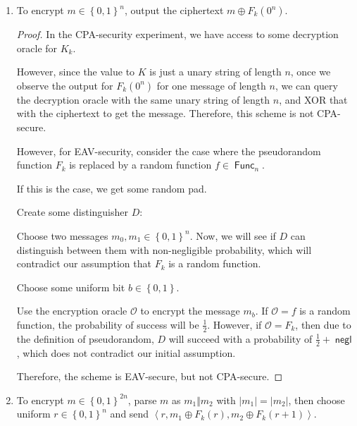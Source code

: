 \documentclass{article}
\DeclareMathOperator{\Func}{\textsf{Func}}
\DeclareMathOperator{\negl}{\textsf{negl}}
\begin{document}
\begin{enumerate}
\begin{enumerate}
\begin{proof}
            Therefore, it is neither EAV-secure, nor CPA-secure.
          \end{proof}

        \item To encrypt $m \in \left\{0, 1\right\}^n$, output the ciphertext $m
          \oplus F_k(0^n)$.

          \begin{proof}
            In the CPA-security experiment, we have access to some decryption
            oracle for $K_k$.

            However, since the value to $K$ is just a unary string of length
            $n$, once we observe the output for $F_k(0^n)$ for one message of
            length $n$, we can query the decryption oracle with the same unary
            string of length $n$, and XOR that with the ciphertext to get the
            message. Therefore, this scheme is not CPA-secure.

            However, for EAV-security, consider the case where the pseudorandom
            function $F_k$ is replaced by a random function $f \in \Func_n$.

            If this is the case, we get some random pad.

            Create some distinguisher $D$:

            Choose two messages $m_0, m_1 \in \left\{0, 1\right\}^n$. Now, we
            will see if $D$ can distinguish between them with non-negligible
            probability, which will contradict our assumption that $F_k$ is a
            random function.

            Choose some uniform bit $b \in \left\{0, 1\right\}$.

            Use the encryption oracle $\mathcal{O}$ to encrypt the message
            $m_b$. If $\mathcal{O} = f$ is a random function, the probability of
            success will be $\frac{1}{2}$. However, if $\mathcal{O} = F_k$, then
            due to the definition of pseudorandom, $D$ will succeed with a
            probability of $\frac{1}{2} + \negl$, which does not contradict our
            initial assumption.

            Therefore, the scheme is EAV-secure, but not CPA-secure.
          \end{proof}

        \item To encrypt $m \in \left\{0, 1\right\}^{2n}$, parse $m$ as $m_1
          \Vert m_2$ with $| m_1 | = | m_2 |$, then choose uniform
          $r \in \left\{0, 1\right\}^n$ and send $\left\langle r, m_1 \oplus
          F_k(r), m_2 \oplus F_k(r + 1)\right\rangle$.


\end{enumerate}
\end{enumerate}
\end{document}
